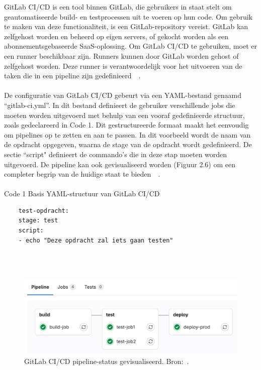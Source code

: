 GitLab CI/CD is een tool binnen GitLab,  die gebruikers in staat stelt om geautomatiseerde build- en testprocessen uit te voeren op hun code. Om gebruik te maken van deze functionaliteit, is een GitLab-repository vereist. GitLab kan zelfgehost worden en beheerd op  eigen servers, of gekocht worden als een abonnementsgebaseerde SaaS-oplossing. Om GitLab CI/CD te gebruiken, moet er een runner beschikbaar zijn. Runners kunnen door GitLab worden gehost of zelfgehost worden. Deze runner is verantwoordelijk voor het uitvoeren van de taken die in een pipeline zijn gedefinieerd~\autocite{gitlabRunner}~\autocite{gitlabCi}. 
\\\\
De configuratie van GitLab CI/CD gebeurt via een YAML-bestand genaamd “gitlab-ci.yml”. In dit bestand definieert de gebruiker verschillende jobs die moeten worden uitgevoerd met behulp van een vooraf gedefinieerde structuur, zoals gedeclareerd in Code 1. Dit gestructureerde formaat maakt het eenvoudig om pipelines op te zetten en aan te passen. In dit voorbeeld wordt de naam van de opdracht opgegeven, waarna de stage van de opdracht wordt gedefinieerd. De sectie ``script" definieert de commando's die in deze stap moeten worden uitgevoerd. De pipeline kan ook gevisualiseerd worden (Figuur 2.6) om een completer begrip van de huidige staat te bieden~\autocite{gitlabPipelines}~\autocite{gitlabRunner}.
\\\\
Code 1 Basis YAML-structuur van GitLab CI/CD
\begin{verbatim}
    test-opdracht:
    stage: test
    script:
    - echo "Deze opdracht zal iets gaan testen"
\end{verbatim}
\\\\
\begin{figure}[H]
    \centering
    \includegraphics[width=0.8\linewidth]{Foto's/pipeline_graph_v17_9.png}
    \caption{GitLab CI/CD pipeline-status gevisualiseerd. Bron:~\autocite{gitlabPipelines}.}
    \label{fig:pipeline-status}
\end{figure}

